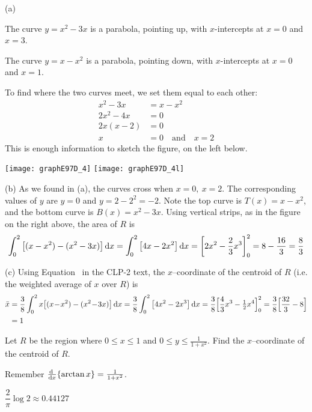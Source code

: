 \begin{solution} (a)

The curve $y=x^2-3x$ is a parabola, pointing up, with $x$-intercepts at $x=0$ and $x=3$.

The curve $y=x-x^2$ is a parabola, pointing down, with $x$-intercepts at $x=0$ and $x=1$.

To find where the two curves meet, we set them equal to each other:
\begin{align*}
x^2-3x&=x-x^2\\
2x^2-4x&=0\\
2x(x-2)&=0\\
x&=0\quad\text{and}\quad x=2
\end{align*}
This is enough information to sketch the figure, on the left below.

\begin{center}
       \texttt{[image: graphE97D\_4]}\qquad
       \texttt{[image: graphE97D\_4l]}
\end{center}



\noindent (b)
As we found in (a),
the curves cross when $ x=0,\
x=2$. The corresponding values of $y$ are $y=0$ and $y=2-2^2=-2$. Note the top curve is $T(x)=x-x^2$, and the bottom curve is $B(x)=x^2-3x$. Using
vertical strips, as in the figure on the  right above, the area of $R$ is
\begin{align*}
\int_0^2\big[(x-x^2)-(x^2-3x)\big]\,\mathrm{d}x
=\int_0^2\big[4x-2x^2\big]\,\mathrm{d}x
=\left[2x^2-\frac{2}{3}x^3\right]_0^2
=8-\frac{16}{3}=\frac{8}{3}
\end{align*}

\noindent (c)
Using Equation~ in the CLP-2 text, the $x$--coordinate of the centroid of $R$ (i.e. the weighted average of
$x$ over $R$)  is
\begin{align*}
\bar x &= \frac{3}{8}\int_0^2x\big[(x\!-\!x^2)-(x^2\!-\!3x)\big]\,\mathrm{d}x
= \frac{3}{8}\int_0^2\big[4x^2-2x^3\big]\,\mathrm{d}x
= \frac{3}{8}\Big[\frac{4}{3}x^3-\tfrac{1}{2} x^4\Big]_0^2
= \frac{3}{8}\Big[\frac{32}{3}-8\Big] \\
&=1
\end{align*}

\end{solution}




\begin{question}[1998A]
Let $R$ be the region where $0\le x\le 1$ and $0\le y\le\frac{1}{1+x^2}$.
Find the $x$--coordinate of the centroid of $R$.
\end{question}
\begin{hint}
Remember $\diff{}{x}\{\arctan x\} = \frac{1}{1+x^2}$.
\end{hint}
\begin{answer}
$\dfrac{2}{\pi}\log 2\approx 0.44127$
\end{answer}

